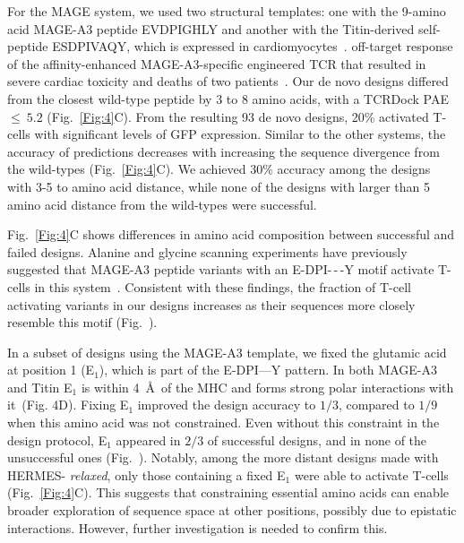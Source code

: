 For the MAGE system, we used two structural templates: one with the 9-amino acid MAGE-A3 peptide
EVDPIGHLY and another with the Titin-derived self-peptide ESDPIVAQY, which is expressed in
cardiomyocytes~\cite{Raman2016-ew}. %
off-target response of the affinity-enhanced MAGE-A3-specific engineered TCR that resulted in severe
cardiac toxicity and deaths of two patients~\cite{Linette2013-tc}.
Our {de novo} designs differed from the closest wild-type peptide by 3 to 8 amino acids, with a
TCRDock PAE~$\leq~5.2$ (Fig.~\ref{Fig:4}C). From the resulting 93 {de novo} designs, 20\% activated
T-cells with significant levels of GFP expression. Similar to the other systems, the accuracy of
predictions decreases with increasing the sequence divergence from the wild-types
(Fig.~\ref{Fig:4}C). We achieved 30\% accuracy among the designs with 3-5 to amino acid distance,
while none of the designs with larger than 5 amino acid distance from the wild-types were
successful.

Fig.~\ref{Fig:4}C shows differences in amino acid composition between successful and failed designs.
Alanine and glycine scanning experiments have previously suggested that MAGE-A3 peptide variants
with an E-DPI-\,-\,-Y motif activate T-cells in this system~\cite{Cameron2013-vw}. Consistent with
these findings, the fraction of T-cell activating variants in our designs increases as their
sequences more closely resemble this motif (Fig.~\DesignExpMageFigure).

In a subset of designs using the MAGE-A3 template, we fixed the glutamic acid at position 1 (E$_1$),
which is part of the E-DPI---Y pattern. In both MAGE-A3 and Titin E$_1$ is within 4~\AA~of the MHC
and forms strong polar interactions with it~(Fig. 4D). Fixing E$_1$ improved the design accuracy to
$1/3$, compared to $1/9$ when this amino acid was not constrained. Even without this constraint in
the design protocol, E$_1$ appeared in $2/3$ of successful designs, and in none of the unsuccessful
ones (Fig.~\DesignExpMageFigure). Notably, among the more distant designs made with HERMES-{\em
relaxed}, only those containing a fixed E$_1$ were able to activate T-cells (Fig.~\ref{Fig:4}C).
This suggests that constraining essential amino acids can enable broader exploration of sequence
space at other positions, possibly due to epistatic interactions. However, further investigation is
needed to confirm this.

